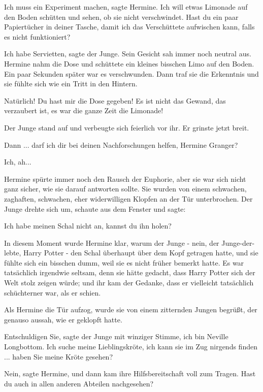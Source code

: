 \glqq{}Ich muss ein Experiment machen\grqq{}, sagte Hermine. \glqq{}Ich will etwas
Limonade auf den Boden schütten und sehen, ob sie nicht verschwindet. Hast du
ein paar Papiertücher in deiner Tasche, damit ich das Verschüttete aufwischen
kann, falls es nicht funktioniert?\grqq{}

\glqq{}Ich habe Servietten\grqq{}, sagte der Junge. Sein Gesicht sah immer noch
neutral aus. Hermine nahm die Dose und schüttete ein kleines bisschen Limo auf
den Boden. Ein paar Sekunden später war es verschwunden. Dann traf sie die
Erkenntnis und sie fühlte sich wie ein Tritt in den Hintern.

\glqq{}Natürlich! Du hast mir die Dose gegeben! Es ist nicht das Gewand, das
verzaubert ist, es war die ganze Zeit die Limonade!\grqq{}

Der Junge stand auf und verbeugte sich feierlich vor ihr. Er grinste jetzt
breit.

\glqq{}Dann ... darf ich dir bei deinen Nachforschungen helfen, Hermine
Granger?\grqq{}

\glqq{}Ich, ah...\grqq{}

Hermine spürte immer noch den Rausch der Euphorie, aber sie war sich nicht ganz
sicher, wie sie darauf antworten sollte. Sie wurden von einem schwachen,
zaghaften, schwachen, eher widerwilligen Klopfen an der Tür unterbrochen. Der
Junge drehte sich um, schaute aus dem Fenster und sagte:

\glqq{}Ich habe meinen Schal nicht an, kannst du ihn holen?\grqq{}

In diesem Moment wurde Hermine klar, warum der Junge - nein, der
Junge-der-lebte, Harry Potter - den Schal überhaupt über dem Kopf getragen
hatte, und sie fühlte sich ein bisschen dumm, weil sie es nicht früher bemerkt
hatte. Es war tatsächlich irgendwie seltsam, denn sie hätte gedacht, dass Harry
Potter sich der Welt stolz zeigen würde; und ihr kam der Gedanke, dass er
vielleicht tatsächlich schüchterner war, als er schien.

Als Hermine die Tür aufzog, wurde sie von einem zitternden Jungen begrüßt, der
genauso aussah, wie er geklopft hatte.

\glqq{}Entschuldigen Sie\grqq{}, sagte der Junge mit winziger Stimme, \glqq{}ich
bin Neville Longbottom. Ich suche meine Lieblingskröte, ich kann sie im Zug
nirgends finden ... haben Sie meine Kröte gesehen?\grqq{}

\glqq{}Nein\grqq{}, sagte Hermine, und dann kam ihre Hilfsbereitschaft voll zum
Tragen. \glqq{}Hast du auch in allen anderen Abteilen nachgesehen?\grqq{}

